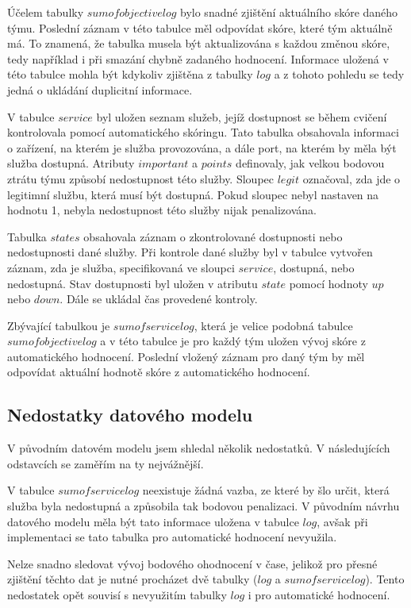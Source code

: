 \documentclass[
  digital, %
  twoside, %
  table,   %
  nolof,     %
  nolot,     %
]{fithesis3}
\begin{document}
Účelem tabulky $sumofobjectivelog$ bylo snadné zjištění aktuálního skóre daného týmu. Poslední záznam v této tabulce měl odpovídat skóre, které tým aktuálně má. To znamená, že tabulka musela být aktualizována s každou změnou skóre, tedy například i při smazání chybně zadaného hodnocení. Informace uložená v této tabulce mohla být kdykoliv zjištěna z tabulky $log$ a z tohoto pohledu se tedy jedná o ukládání duplicitní informace.

V tabulce $service$ byl uložen seznam služeb, jejíž dostupnost se během cvičení kontrolovala pomocí automatického skóringu. Tato tabulka obsahovala informaci o zařízení, na kterém je služba provozována, a dále port, na kterém by měla být služba dostupná. Atributy $important$ a $points$ definovaly, jak velkou bodovou ztrátu týmu způsobí nedostupnost této služby. Sloupec $legit$ označoval, zda jde o legitimní službu, která musí být dostupná. Pokud sloupec nebyl nastaven na hodnotu 1, nebyla nedostupnost této služby nijak penalizována. 

Tabulka $states$ obsahovala záznam o zkontrolované dostupnosti nebo nedostupnosti dané služby. Při kontrole dané služby byl v tabulce vytvořen záznam, zda je služba, specifikovaná ve sloupci $service$, dostupná, nebo nedostupná. Stav dostupnosti byl uložen v atributu $state$ pomocí hodnoty $up$ nebo $down$. Dále se ukládal čas provedené kontroly.

Zbývající tabulkou je $sumofservicelog$, která je velice podobná tabulce $sumofobjectivelog$ a v této tabulce je pro každý tým uložen vývoj skóre z automatického hodnocení. Poslední vložený záznam pro daný tým by měl odpovídat aktuální hodnotě skóre z automatického hodnocení.

\subsection{Nedostatky datového modelu}

V původním datovém modelu jsem shledal několik nedostatků. V následujících odstavcích se zaměřím na ty nejvážnější.

V tabulce $sumofservicelog$ neexistuje žádná vazba, ze které by šlo určit, která služba byla nedostupná a způsobila tak bodovou penalizaci. V původním návrhu datového modelu měla být tato informace uložena v tabulce $log$, avšak při implementaci se tato tabulka pro automatické hodnocení nevyužila. 

Nelze snadno sledovat vývoj bodového ohodnocení v čase, jelikož pro přesné zjištění těchto dat je nutné procházet dvě tabulky ($log$ a $sumofservicelog$). Tento nedostatek opět souvisí s nevyužitím tabulky $log$ i pro automatické hodnocení.
\end{document}
